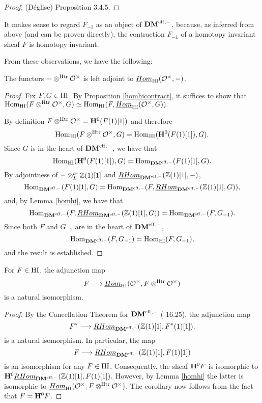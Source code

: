 \begin{proof}
(D\'eglise) \cite{Deg08b} Proposition 3.4.5.
\end{proof}


\begin{rmk}
It makes sense to regard $F_{-1}$ as an object of $\DMm$,
because, as inferred from above (and can be proven directly),
the contraction $F_{-1}$ of a homotopy invariant sheaf $F$ is 
homotopy invariant. 
\end{rmk}

From these observations, we have the following:

\begin{cor}\label{hiadj}
The functors $ - \tHI \Ox$ is left adjoint to $\ihomHI(\Ox, -)$.
\end{cor}
\begin{proof}
Fix $F, G \in \HI$. By Proposition \ref{homhicontract}, it 
suffices to show that $\homHI(F \tHI \Ox, G) \simeq \homHI(F, 
\ihomHI(\Ox, G)).$ 

By definition $F \tHI \Ox = \H^0(F(1)[1])$ and therefore
\[
\homHI(F \tHI \Ox, G) = \homHI(\H^0(F(1)[1]), G).
\]
Since $G$ is in the heart of $\DMm$, we have that
\[
\homHI(\H^0(F(1)[1]), G) = \homDM(F(1)[1], G).
\]
By adjointness of $-\tDM \Z(1)[1]$ and $\rhomDM(\Z(1)[1], -)$,
\[
\homDM(F(1)[1], G) = \homDM(F, \rhomDM(\Z(1)[1], G)),
\]
and, by Lemma \ref{homhi}, we have that
\[
\homDM(F, \rhomDM(\Z(1)[1], G)) = \homDM(F, G_{-1}).
\]
Since both $F$ and $G_{-1}$ are in the heart of $\DMm$,
\[
\homDM(F, G_{-1}) = \homHI(F, G_{-1}),
\]
and the result is established.
\end{proof}

\begin{cor}
For $F \in \HI$, the adjunction map 
\[
F \longrightarrow \ihomHI(\Ox, F \tHI \Ox)
\] 
is a natural isomorphism.
\end{cor}
\begin{proof}
By the Cancellation Theorem for $\DMm$ (\cite{MVW} 16.25), the 
adjunction map 
\[
F^* \longrightarrow \rhomDM(\Z(1)[1], F^*(1)[1]).
\] 
is a natural isomorphism. In particular, the map 
\[
F \longrightarrow \rhomDM(\Z(1)[1], F(1)[1])
\]
is an isomorphism for any $F \in \HI$. Consequently, the sheaf 
$\H^0 F$ is isomorphic to $\H^0\rhomDM(\Z(1)[1],\allowbreak 
F(1)[1]).$ However, by Lemma \ref{homhi} the latter is isomorphic 
to $\ihomHI(\Ox,\allowbreak F \tHI\Ox)$. The corollary now 
follows from the fact that $F = \H^0 F$.
\end{proof}

